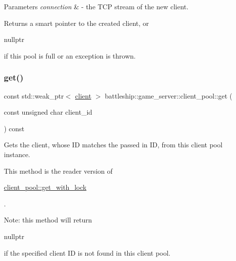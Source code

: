 \begin{DoxyParams}{Parameters}
{\em connection} & -\/ the T\+CP stream of the new client. \\
\hline
\end{DoxyParams}
\begin{DoxyReturn}{Returns}
a smart pointer to the created client, or
\begin{DoxyCode}
\textcolor{keyword}{nullptr} 
\end{DoxyCode}
 if this pool is full or an exception is thrown. 
\end{DoxyReturn}
\mbox{\label{classbattleship_1_1game__server_1_1client__pool_a39d1db920be949755ebe64b50d2bff96}} 
\subsubsection{\texorpdfstring{get()}{get()}}
{\footnotesize\ttfamily const std\+::weak\+\_\+ptr$<$ \hyperlink{classbattleship_1_1game__server_1_1client}{client} $>$ battleship\+::game\+\_\+server\+::client\+\_\+pool\+::get (\begin{DoxyParamCaption}\item[{const unsigned char}]{client\+\_\+id }\end{DoxyParamCaption}) const}

Gets the client, whose ID matches the passed in ID, from this client pool instance.

This method is the reader version of
\begin{DoxyCode}
\hyperlink{classbattleship_1_1game__server_1_1client__pool_ab8282d54f2e950f6625508a274dd96d9}{client\_pool::get\_with\_lock} 
\end{DoxyCode}
 .

Note\+: this method will return
\begin{DoxyCode}
\textcolor{keyword}{nullptr} 
\end{DoxyCode}
 if the specified client ID is not found in this client pool.


